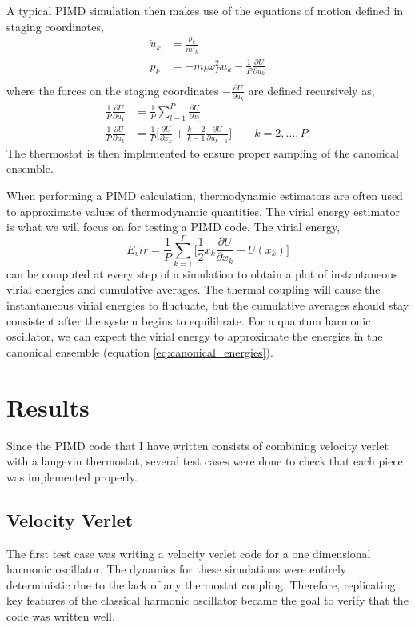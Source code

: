 \documentclass{article}
\newcommand{\be}{\begin{equation}}
\newcommand{\ee}{\end{equation}}
\begin{document}
A typical PIMD simulation then makes use of the equations of motion defined in staging coordinates,
\be
  \begin{split}
    \dot{u}_k &= \frac{p_k}{m'_k} \\
    \dot{p}_k &= - m_k \omega_P^2 u_k - \frac{1}{P} \frac{\partial U}{\partial u_k} \\
  \end{split}
\ee
where the forces on the staging coordinates $- \frac{\partial U}{\partial u_k}$ are defined recursively as,
\be
  \begin{split}
    \frac{1}{P} \frac{\partial U}{\partial u_1} &= \frac{1}{P} \sum_{l-1}^{P} \frac{\partial U}{\partial x_l} \\
    \frac{1}{P} \frac{\partial U}{\partial u_k} &= \frac{1}{P} \Big[ \frac{\partial U}{\partial x_k} + \frac{k-2}{k-1} \frac{\partial U}{\partial u_{k-1}}\Big] \quad \quad k = 2,\dots, P .
  \end{split}
\ee
The thermostat is then implemented to ensure proper sampling of the canonical ensemble.\cite{Liu}

When performing a PIMD calculation, thermodynamic estimators are often used to approximate values of thermodynamic quantities.
The virial energy estimator is what we will focus on for testing a PIMD code.
The virial energy,
\be
  E_vir = \frac{1}{P} \sum_{k=1}^P \Big[ \frac{1}{2}x_k \frac{\partial U}{\partial x_k} + U(x_k) \Big]
\ee
can be computed at every step of a simulation to obtain a plot of instantaneous virial energies and cumulative averages.
The thermal coupling will cause the instantaneous virial energies to fluctuate, but the cumulative averages should stay consistent after the system begins to equilibrate.
For a quantum harmonic oscillator, we can expect the virial energy to approximate the energies in the canonical ensemble (equation \ref{eq:canonical_energies}).

\section{Results}
Since the PIMD code that I have written consists of combining velocity verlet with a langevin thermostat, several test cases were done to check that each piece was implemented properly.

\subsection{Velocity Verlet}
The first test case was writing a velocity verlet code for a one dimensional harmonic oscillator.
The dynamics for these simulations were entirely deterministic due to the lack of any thermostat coupling.
Therefore, replicating key features of the classical harmonic oscillator became the goal to verify that the code was written well.
\end{document}
